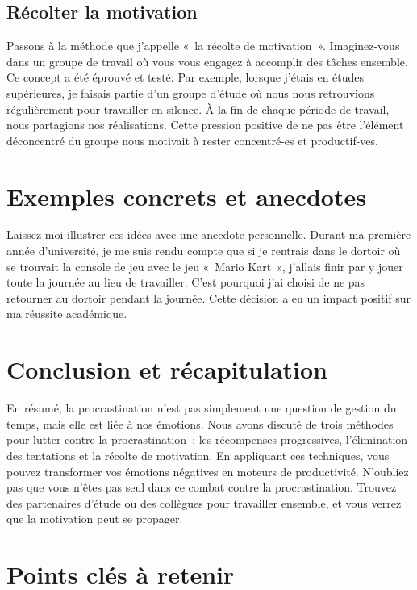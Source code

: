 \documentclass[a4paper, 10pt, garamond]{book}
\begin{document}
\subsection{Récolter la motivation}

Passons à la méthode que j'appelle «~la récolte de motivation~». Imaginez-vous
dans un groupe de travail où vous vous engagez à accomplir des tâches ensemble.
Ce concept a été éprouvé et testé. Par exemple, lorsque j'étais en études
supérieures, je faisais partie d'un groupe d'étude où nous nous retrouvions
régulièrement pour travailler en silence. À la fin de chaque période de travail,
nous partagions nos réalisations. Cette pression positive de ne pas être
l'élément déconcentré du groupe nous motivait à rester concentré-es et
productif-ves.

\section{Exemples concrets et anecdotes}

Laissez-moi illustrer ces idées avec une anecdote personnelle. Durant ma
première année d'université, je me suis rendu compte que si je rentrais dans le
dortoir où se trouvait la console de jeu avec le jeu «~Mario Kart~», j'allais
finir par y jouer toute la journée au lieu de travailler. C'est pourquoi j'ai
choisi de ne pas retourner au dortoir pendant la journée. Cette décision a eu un
impact positif sur ma réussite académique.

\section{Conclusion et récapitulation}

En résumé, la procrastination n'est pas simplement une question de gestion du
temps, mais elle est liée à nos émotions. Nous avons discuté de trois méthodes
pour lutter contre la procrastination~: les récompenses progressives,
l'élimination des tentations et la récolte de motivation. En appliquant ces
techniques, vous pouvez transformer vos émotions négatives en moteurs de
productivité. N'oubliez pas que vous n'êtes pas seul dans ce combat contre la
procrastination. Trouvez des partenaires d'étude ou des collègues pour
travailler ensemble, et vous verrez que la motivation peut se propager.

\section{Points clés à retenir}
\end{document}
